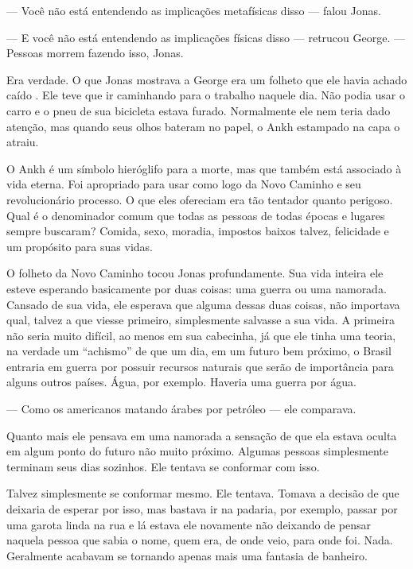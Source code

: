 --- Você não está entendendo as implicações metafísicas disso --- falou Jonas.

--- E você não está entendendo as implicações físicas disso --- retrucou George. --- Pessoas morrem fazendo isso, Jonas.

Era verdade. O que Jonas mostrava a George era um folheto que ele havia achado caído . Ele teve que ir caminhando para o trabalho naquele dia. Não podia usar o carro e o pneu de sua bicicleta estava furado. Normalmente ele nem teria dado atenção, mas quando seus olhos bateram no papel, o Ankh estampado na capa o atraiu.

O Ankh é um símbolo hieróglifo para a morte, mas que também está associado à vida eterna. Foi apropriado para usar como logo da Novo Caminho e seu revolucionário processo. O que eles ofereciam era tão tentador quanto perigoso. Qual é o denominador comum que todas as pessoas de todas épocas e lugares sempre buscaram? Comida, sexo, moradia, impostos baixos talvez, felicidade e um propósito para suas vidas.

O folheto da Novo Caminho tocou Jonas profundamente. Sua vida inteira ele esteve esperando basicamente por duas coisas: uma guerra ou uma namorada. Cansado de sua vida, ele esperava que alguma dessas duas coisas, não importava qual, talvez a que viesse primeiro, simplesmente salvasse a sua vida. A primeira não seria muito difícil, ao menos em sua cabecinha, já que ele tinha uma teoria, na verdade um ``achismo''\mudanca{,} de que um dia, em um futuro bem próximo, o Brasil entraria em guerra por possuir recursos naturais que serão de importância para alguns outros países. Água, por exemplo. Haveria uma guerra por água.

--- Como os americanos matando árabes por petróleo --- ele comparava.

Quanto mais ele pensava em uma namorada a sensação de que ela estava oculta em algum ponto do futuro não muito próximo. Algumas pessoas simplesmente terminam seus dias sozinhos. Ele tentava se conformar com isso.

Talvez  simplesmente se conformar mesmo. Ele tentava. Tomava a decisão de que deixaria de esperar por isso, mas bastava ir na padaria, por exemplo, passar por uma garota linda na rua e lá estava ele novamente não deixando de pensar naquela pessoa que  sabia o nome, quem era, de onde veio, para onde foi. Nada. Geralmente acabavam se tornando apenas mais uma fantasia de banheiro.

